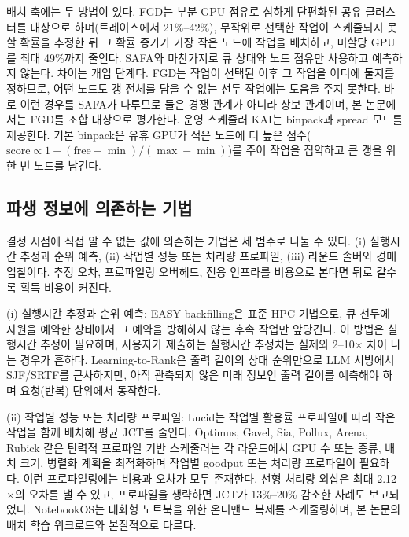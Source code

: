 \documentclass{ieeetj}
\begin{document}
배치 축에는 두 방법이 있다. FGD\cite{weng2023beware}는 부분 GPU 점유로 심하게 단편화된 공유 클러스터를 대상으로 하며(트레이스에서 21\%--42\%), 무작위로 선택한 작업이 스케줄되지 못할 확률을 추정한 뒤 그 확률 증가가 가장 작은 노드에 작업을 배치하고, 미할당 GPU를 최대 49\%까지 줄인다. SAFA와 마찬가지로 큐 상태와 노드 점유만 사용하고 예측하지 않는다. 차이는 개입 단계다. FGD는 작업이 선택된 이후 그 작업을 어디에 둘지를 정하므로, 어떤 노드도 갱 전체를 담을 수 없는 선두 작업에는 도움을 주지 못한다. 바로 이런 경우를 SAFA가 다루므로 둘은 경쟁 관계가 아니라 상보 관계이며, 본 논문에서는 FGD를 조합 대상으로 평가한다. 운영 스케줄러 KAI\cite{kai2025}는 binpack과 spread 모드를 제공한다. 기본 binpack은 유휴 GPU가 적은 노드에 더 높은 점수($\text{score}\propto 1-(\text{free}-\min)/(\max-\min)$)를 주어 작업을 집약하고 큰 갱을 위한 빈 노드를 남긴다.

\subsection{파생 정보에 의존하는 기법}
결정 시점에 직접 알 수 없는 값에 의존하는 기법은 세 범주로 나눌 수 있다. (i) 실행시간 추정과 순위 예측, (ii) 작업별 성능 또는 처리량 프로파일, (iii) 라운드 솔버와 경매 입찰이다. 추정 오차, 프로파일링 오버헤드, 전용 인프라를 비용으로 본다면 뒤로 갈수록 획득 비용이 커진다.

(i) 실행시간 추정과 순위 예측: EASY backfilling\cite{mualem2001backfilling}은 표준 HPC 기법으로, 큐 선두에 자원을 예약한 상태에서 그 예약을 방해하지 않는 후속 작업만 앞당긴다. 이 방법은 실행시간 추정이 필요하며, 사용자가 제출하는 실행시간 추정치는 실제와 2--10$\times$ 차이 나는 경우가 흔하다. Learning-to-Rank\cite{fu2024efficient}은 출력 길이의 상대 순위만으로 LLM 서빙에서 SJF/SRTF를 근사하지만, 아직 관측되지 않은 미래 정보인 출력 길이를 예측해야 하며 요청(반복) 단위에서 동작한다.

(ii) 작업별 성능 또는 처리량 프로파일: Lucid\cite{b5}는 작업별 활용률 프로파일에 따라 작은 작업을 함께 배치해 평균 JCT를 줄인다. Optimus\cite{peng2018optimus}, Gavel\cite{narayanan2020gavel}, Sia\cite{b4}, Pollux\cite{qiao2021pollux}, Arena\cite{arena2026}, Rubick\cite{rubick2025} 같은 탄력적 프로파일 기반 스케줄러는 각 라운드에서 GPU 수 또는 종류, 배치 크기, 병렬화 계획을 최적화하며 작업별 goodput 또는 처리량 프로파일이 필요하다. 이런 프로파일링에는 비용과 오차가 모두 존재한다. 선형 처리량 외삽은 최대 2.12$\times$의 오차를 낼 수 있고, 프로파일을 생략하면 JCT가 13\%--20\% 감소한 사례도 보고되었다\cite{schedmate2025}. NotebookOS\cite{notebookos2026}는 대화형 노트북을 위한 온디맨드 복제를 스케줄링하며, 본 논문의 배치 학습 워크로드와 본질적으로 다르다.
\end{document}
